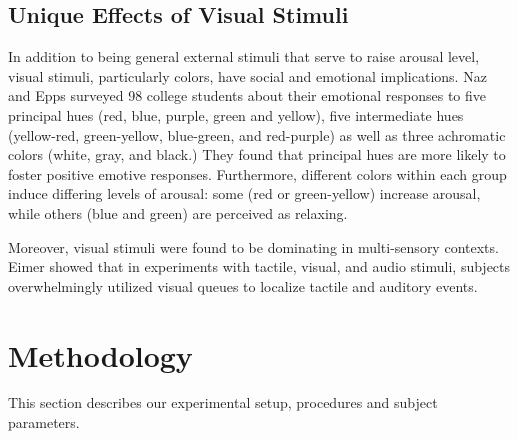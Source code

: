 \documentclass{llncs}
\begin{document}
\subsection{Unique Effects of Visual Stimuli}
In addition to being general external stimuli that serve to raise arousal level, 
visual stimuli, particularly colors, have social and emotional implications. Naz and Epps \cite{1} 
surveyed 98 college students about their emotional responses to five principal hues 
(red, blue, purple, green and yellow), five intermediate hues (yellow-red, green-yellow, blue-green, 
and red-purple) as well as three achromatic colors (white, gray, and black.) They found that principal 
hues are more likely to foster positive emotive responses. Furthermore, different colors within 
each group induce differing levels of arousal: some (red or green-yellow) 
increase arousal, while others (blue and green) are perceived as relaxing.

Moreover, visual stimuli were found to be dominating in multi-sensory contexts. 
Eimer \cite{eimer_multisensory_2004} showed that in experiments with tactile, visual, and audio stimuli, 
subjects overwhelmingly utilized visual queues to localize tactile and auditory events. 

\section{Methodology}
\label{sec:experiment}
%
This section describes our experimental setup, procedures and subject parameters.
\end{document}
